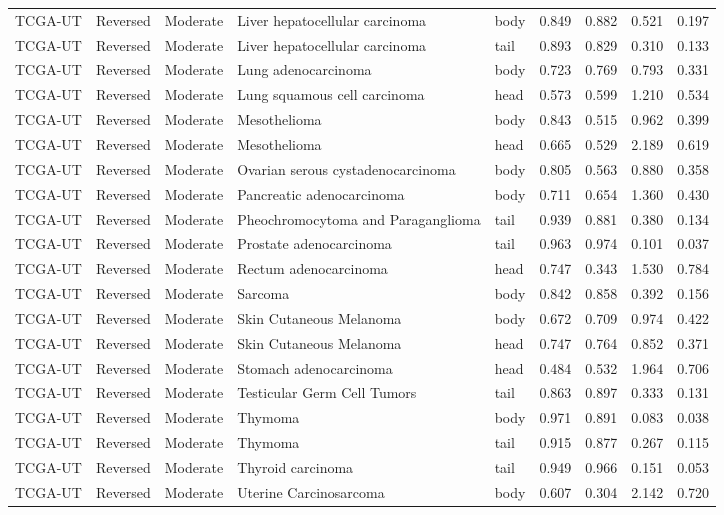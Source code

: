 \begin{longtable}{lllllrrrr}
TCGA-UT & Reversed & Moderate & Liver hepatocellular carcinoma & body & 0.849 & 0.882 & 0.521 & 0.197 \\
TCGA-UT & Reversed & Moderate & Liver hepatocellular carcinoma & tail & 0.893 & 0.829 & 0.310 & 0.133 \\
TCGA-UT & Reversed & Moderate & Lung adenocarcinoma & body & 0.723 & 0.769 & 0.793 & 0.331 \\
TCGA-UT & Reversed & Moderate & Lung squamous cell carcinoma & head & 0.573 & 0.599 & 1.210 & 0.534 \\
TCGA-UT & Reversed & Moderate & Mesothelioma & body & 0.843 & 0.515 & 0.962 & 0.399 \\
TCGA-UT & Reversed & Moderate & Mesothelioma & head & 0.665 & 0.529 & 2.189 & 0.619 \\
TCGA-UT & Reversed & Moderate & Ovarian serous cystadenocarcinoma & body & 0.805 & 0.563 & 0.880 & 0.358 \\
TCGA-UT & Reversed & Moderate & Pancreatic adenocarcinoma & body & 0.711 & 0.654 & 1.360 & 0.430 \\
TCGA-UT & Reversed & Moderate & Pheochromocytoma and Paraganglioma & tail & 0.939 & 0.881 & 0.380 & 0.134 \\
TCGA-UT & Reversed & Moderate & Prostate adenocarcinoma & tail & 0.963 & 0.974 & 0.101 & 0.037 \\
TCGA-UT & Reversed & Moderate & Rectum adenocarcinoma & head & 0.747 & 0.343 & 1.530 & 0.784 \\
TCGA-UT & Reversed & Moderate & Sarcoma & body & 0.842 & 0.858 & 0.392 & 0.156 \\
TCGA-UT & Reversed & Moderate & Skin Cutaneous Melanoma & body & 0.672 & 0.709 & 0.974 & 0.422 \\
TCGA-UT & Reversed & Moderate & Skin Cutaneous Melanoma & head & 0.747 & 0.764 & 0.852 & 0.371 \\
TCGA-UT & Reversed & Moderate & Stomach adenocarcinoma & head & 0.484 & 0.532 & 1.964 & 0.706 \\
TCGA-UT & Reversed & Moderate & Testicular Germ Cell Tumors & tail & 0.863 & 0.897 & 0.333 & 0.131 \\
TCGA-UT & Reversed & Moderate & Thymoma & body & 0.971 & 0.891 & 0.083 & 0.038 \\
TCGA-UT & Reversed & Moderate & Thymoma & tail & 0.915 & 0.877 & 0.267 & 0.115 \\
TCGA-UT & Reversed & Moderate & Thyroid carcinoma & tail & 0.949 & 0.966 & 0.151 & 0.053 \\
TCGA-UT & Reversed & Moderate & Uterine Carcinosarcoma & body & 0.607 & 0.304 & 2.142 & 0.720 \\

\end{longtable}
